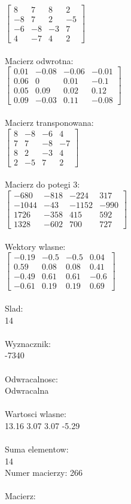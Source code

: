 \documentclass[a4paper,12pt]{article}
\begin{document}
$\begin{bmatrix} 8&7&8&2\\-8&7&2&-5\\-6&-8&-3&7\\4&-7&4&2 \end{bmatrix}$
\\
\\
Macierz odwrotna:\\

$\begin{bmatrix} 0.01&-0.08&-0.06&-0.01\\0.06&0&0.01&-0.1\\0.05&0.09&0.02&0.12\\0.09&-0.03&0.11&-0.08 \end{bmatrix}$
\\
\\
Macierz transponowana:\\

$\begin{bmatrix} 8&-8&-6&4\\7&7&-8&-7\\8&2&-3&4\\2&-5&7&2 \end{bmatrix}$
\\
\\
Macierz do potegi 3:\\

$\begin{bmatrix} -680&-818&-224&317\\-1044&-43&-1152&-990\\1726&-358&415&592\\1328&-602&700&727 \end{bmatrix}$
\\
\\
Wektory wlasne:\\

$\begin{bmatrix} -0.19&-0.5&-0.5&0.04\\0.59&0.08&0.08&0.41\\-0.49&0.61&0.61&-0.6\\-0.61&0.19&0.19&0.69 \end{bmatrix}$
\\
\\
Slad:\\
14
\\
\\
Wyznacznik:\\
-7340
\\
\\
Odwracalnosc:\\
Odwracalna
\\
\\
Wartosci wlasne:\\
13.16 3.07 3.07 -5.29
\\
\\
Suma elementow:\\
14
\\
\newpage
Numer macierzy:
266
\\
\\
Macierz:\\
\end{document}
